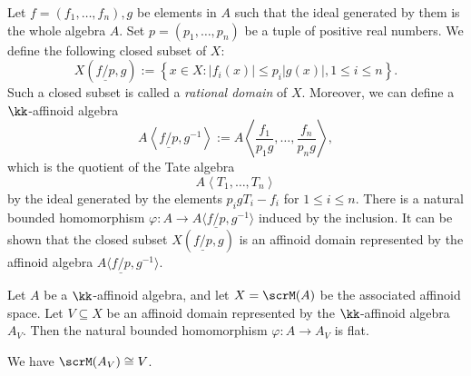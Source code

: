     \begin{construction}\label{cons:rational_domain}
        Let \(f=(f_1,\ldots,f_n),g\) be elements in \(A\) such that the ideal generated by them is the whole algebra \(A\).
        Set \(p=(p_1,\ldots,p_n)\) be a tuple of positive real numbers.
        We define the following closed subset of \(X\):
        \[ X\left(\underline{f/p},g\right) := \left\{ x \in X \colon |f_i(x)| \le p_i |g(x)|, 1 \le i \le n \right\}. \]
        Such a closed subset is called a \emph{rational domain} of \(X\).
        Moreover, we can define a \(\kk\)-affinoid algebra
        \[ A\left\langle \underline{f/p},g^{-1} \right\rangle := A\left\langle \frac{f_1}{p_1 g},\ldots,\frac{f_n}{p_n g} \right\rangle, \]
        which is the quotient of the Tate algebra
        \[ A\left\langle T_1,\ldots,T_n \right\rangle \]
        by the ideal generated by the elements \(p_i g T_i - f_i\) for \(1 \le i \le n\).
        There is a natural bounded homomorphism \(\varphi: A \to A\langle \underline{f/p},g^{-1} \rangle\) induced by the inclusion.
        It can be shown that the closed subset \(X(\underline{f/p},g)\) is an affinoid domain represented by the affinoid algebra \(A\langle \underline{f/p},g^{-1} \rangle\).
    \end{construction}

    \begin{proposition}\label{prop:affinoid_domain_is_flat_over_base}
        Let \(A\) be a \(\kk\)-affinoid algebra, and let \(X = \scrM(A)\) be the associated affinoid space.
        Let \(V \subseteq X\) be an affinoid domain represented by the \(\kk\)-affinoid algebra \(A_V\).
        Then the natural bounded homomorphism \(\varphi: A \to A_V\) is flat.

        We have \(\scrM(A_V) \cong V\).
    \end{proposition}